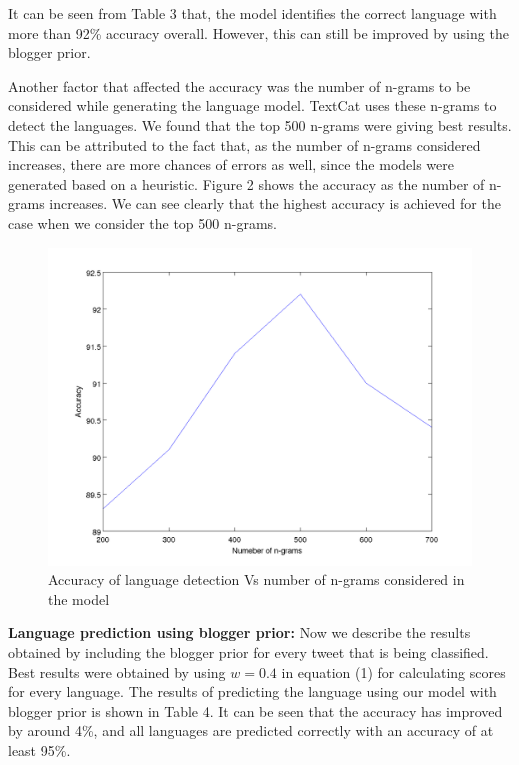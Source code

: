 \documentclass[11pt]{article}
\begin{document}
It can be seen from Table 3 that, the model identifies the correct language with more than 92\% accuracy overall. However, this can still be improved by using the blogger prior.

Another factor that affected the accuracy was the number of n-grams to be considered while generating the language model. TextCat uses these n-grams to detect the languages. We found that the top 500 n-grams were giving best results. This can be attributed to the fact that, as the number of n-grams considered increases, there are more chances of errors as well, since the models were generated based on a heuristic. Figure 2 shows the accuracy as the number of n-grams increases. We can see clearly that the highest accuracy is achieved for the case when we consider the top 500 n-grams.

\begin{figure}[ht]
\includegraphics[scale=0.35]{ngramsVsAccuracy.png}
\caption{\footnotesize Accuracy of language detection Vs number of n-grams considered in the model}
\label{fig:s3}
\end{figure}


{\textbf {Language prediction using blogger prior: }} Now we describe the results obtained by including the blogger prior for every tweet that is being classified. Best results were obtained by using $w = 0.4$ in equation (1) for calculating scores for every language. The results of predicting the language using our model with blogger prior is shown in Table 4. It can be seen that the accuracy has improved by around 4\%, and all languages are predicted correctly with an accuracy of at least 95\%.
\end{document}
